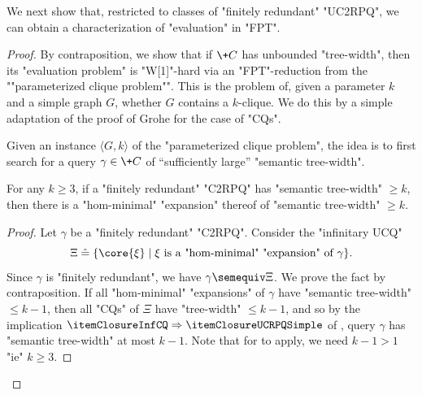 We next show that, restricted to classes of "finitely redundant" "UC2RPQ", we can obtain a characterization of "evaluation" in "FPT".
\thmtractabilityfinred
\begin{proof}
     By contraposition, we show that if $\+C$ has unbounded "tree-width", then its "evaluation problem" is "W[1]"-hard via an "FPT"-reduction from the 
    \AP
    ""parameterized clique problem"". This is the problem of, given a parameter $k$ and a simple graph $G$, whether $G$ contains a $k$-clique. We do this by a simple adaptation of the proof of Grohe \cite[Theorem~4.1]{Grohe2007ComplexityHomomorphism} for the case of "CQs".

    Given an instance $\langle G,k \rangle$ of the "parameterized clique problem", the idea is to first search for a query $\gamma \in \+C$ of ``sufficiently large'' "semantic tree-width". 
    

    \begin{proposition}
        \label{prop:big-expansion}
        For any $k \geq 3$, if a "finitely redundant" "C2RPQ" has "semantic tree-width" $\geq k$, then there is a "hom-minimal" "expansion" thereof of "semantic tree-width" $\geq k$.
    \end{proposition}

    \begin{proof}
        Let $\gamma$ be a "finitely redundant" "C2RPQ".
        Consider the "infinitary UCQ" \[\Xi \defeq \{\core{\xi} \mid \xi \text{ is a "hom-minimal" "expansion" of } \gamma \}.\]
        Since $\gamma$ is "finitely redundant", we have $\gamma \semequiv \Xi$.
        We prove the fact by contraposition.
        If all "hom-minimal" "expansions" of $\gamma$ have "semantic tree-width" $\leq k-1$,
        then all "CQs" of $\Xi$ have "tree-width" $\leq k-1$, and so
        by the implication $\itemClosureInfCQ \Rightarrow \itemClosureUCRPQSimple$ of , query $\gamma$ has "semantic tree-width" at most $k-1$.
        Note that for  to apply, we need $k-1 > 1$
        "ie" $k \geq 3$.
    \end{proof}


\end{proof}
